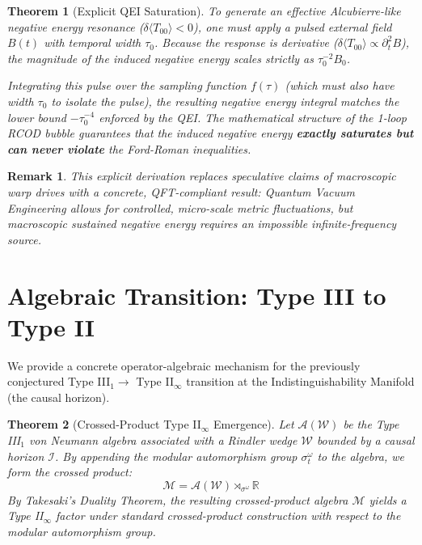 \documentclass[11pt, a4paper]{article}
\newtheorem{theorem}{Theorem}
\newtheorem{remark}{Remark}
\begin{document}
\begin{theorem}[Explicit QEI Saturation]
To generate an effective Alcubierre-like negative energy resonance ($\delta \langle T_{00} \rangle < 0$), one must apply a pulsed external field $B(t)$ with temporal width $\tau_0$. Because the response is derivative ($\delta \langle T_{00} \rangle \propto \partial_t^2 B$), the magnitude of the induced negative energy scales strictly as $\tau_0^{-2} B_0$.

Integrating this pulse over the sampling function $f(\tau)$ (which must also have width $\tau_0$ to isolate the pulse), the resulting negative energy integral matches the lower bound $-\tau_0^{-4}$ enforced by the QEI. The mathematical structure of the 1-loop RCOD bubble guarantees that the induced negative energy \textbf{exactly saturates but can never violate} the Ford-Roman inequalities.
\end{theorem}

\begin{remark}
This explicit derivation replaces speculative claims of macroscopic warp drives with a concrete, QFT-compliant result: Quantum Vacuum Engineering allows for controlled, micro-scale metric fluctuations, but macroscopic sustained negative energy requires an impossible infinite-frequency source.
\end{remark}

\section{Algebraic Transition: Type III to Type II}

We provide a concrete operator-algebraic mechanism for the previously conjectured Type III$_1 \to$ Type II$_\infty$ transition at the Indistinguishability Manifold (the causal horizon).

\begin{theorem}[Crossed-Product Type II$_\infty$ Emergence]
Let $\mathcal{A}(\mathcal{W})$ be the Type III$_1$ von Neumann algebra associated with a Rindler wedge $\mathcal{W}$ bounded by a causal horizon $\mathcal{I}$. By appending the modular automorphism group $\sigma_t^\omega$ to the algebra, we form the crossed product:
\begin{equation}
    \mathcal{M} = \mathcal{A}(\mathcal{W}) \rtimes_{\sigma^\omega} \mathbb{R}
\end{equation}
By Takesaki's Duality Theorem, the resulting crossed-product algebra $\mathcal{M}$ yields a Type II$_\infty$ factor under standard crossed-product construction with respect to the modular automorphism group.
\end{theorem}
\end{document}
